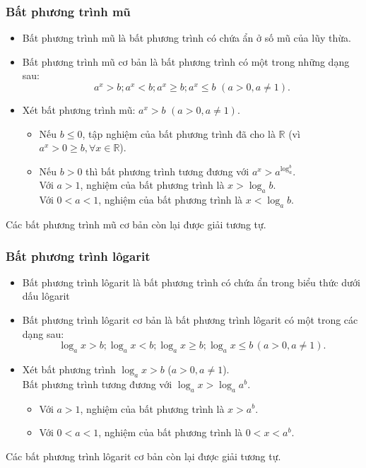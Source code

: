 \begin{tomtat}
	\subsubsection{Bất phương trình mũ}
	\begin{itemize}
		\item Bất phương trình mũ là bất phương trình có chứa ẩn ở số mũ của lũy thừa.
		\item Bất phương trình mũ cơ bản là bất phương trình có một trong những dạng sau:
		$$a^x>b; a^x<b; a^x\geq b; a^x \leq b\,\, (a>0,a\neq 1).$$
		\item Xét bất phương trình mũ: $a^x>b\, \, (a>0, a\neq 1)$.
		\begin{itemize}
			\item Nếu $b\leq 0$, tập nghiệm của bất phương trình đã cho là $\mathbb{R}$ (vì $a^x>0\geq b, \forall x\in \mathbb{R}$).
			\item Nếu $b>0$ thì bất phương trình tương đương với $a^x>a^{\log_a^b}$.\\
			Với $a>1$, nghiệm của bất phương trình là $x>\log_a b$.\\
			Với $0<a<1$, nghiệm của bất phương trình là $x<\log_a b$.
		\end{itemize}
	\end{itemize}
	\begin{nx}
		Các bất phương trình mũ cơ bản còn lại được giải tương tự.
	\end{nx}
	\subsubsection{Bất phương trình lôgarit}
	\begin{itemize}
		\item Bất phương trình lôgarit là bất phương trình có chứa ẩn trong biểu thức dưới dấu lôgarit
		\item Bất phương trình lôgarit cơ bản là bất phương trình lôgarit có một trong các dạng sau:
		$$\log_a x>b; \log_a x<b;\log_a x\geq b; \log_a x\leq b\, (a>0, a\neq 1).$$
		\item Xét bất phương trình $\log_ax>b$ ($a>0, a\neq 1$).\\
		Bất phương trình tương đương với $\log_a x>\log_a a^b$.
		\begin{itemize}
			\item Với $a>1$, nghiệm của bất phương trình là $x>a^b$.
			\item Với $0<a<1$, nghiệm của bất phương trình là $0<x<a^b$.
		\end{itemize}
	\end{itemize}
	\begin{nx}
		Các bất phương trình lôgarit cơ bản còn lại được giải tương tự.
	\end{nx}
\end{tomtat} \setcounter{subsubsection}{0}
\setcounter{ex}{0}
\setcounter{bt}{0}
